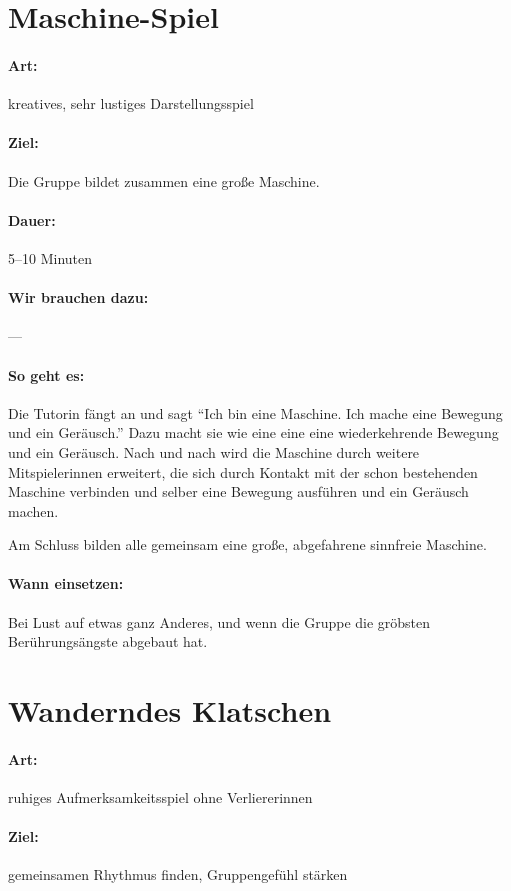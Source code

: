 \section{Maschine-Spiel}
\paragraph{Art:} kreatives, sehr lustiges Darstellungsspiel
\paragraph{Ziel:} Die Gruppe bildet zusammen eine große Maschine.
\paragraph{Dauer:} 5--10 Minuten
\paragraph{Wir brauchen dazu:} ---
\paragraph{So geht es:} Die Tutorin fängt an und sagt "`Ich bin eine Maschine. Ich mache eine Bewegung und ein Geräusch."' Dazu macht sie wie eine eine eine wiederkehrende Bewegung und ein Geräusch. Nach und nach wird die Maschine durch weitere Mitspielerinnen erweitert, die sich durch Kontakt mit der schon bestehenden Maschine verbinden und selber eine Bewegung ausführen und ein Geräusch machen.

Am Schluss bilden alle gemeinsam eine große, abgefahrene sinnfreie Maschine.
\paragraph{Wann einsetzen:} Bei Lust auf etwas ganz Anderes, und wenn die Gruppe die gröbsten Berührungsängste abgebaut hat.

\section{Wanderndes Klatschen}
\paragraph{Art:} ruhiges Aufmerksamkeitsspiel ohne Verliererinnen
\paragraph{Ziel:} gemeinsamen Rhythmus finden, Gruppengefühl stärken
